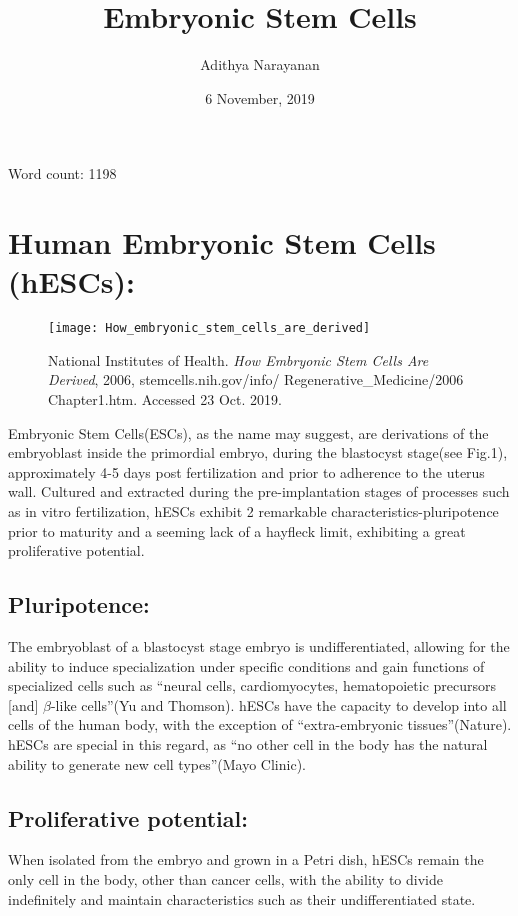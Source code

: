 \documentclass[11pt, a4]{article}
\title{\vspace{90mm}Embryonic Stem Cells}
\author{Adithya Narayanan}
\date{6 November, 2019}
\begin{document}
	\begin{titlepage}
		\maketitle
		\centering
			Word count: 1198
		\thispagestyle{empty}
	\end{titlepage}
	\newpage
	\tableofcontents
	\thispagestyle{empty}
	\newpage
	\setcounter{page}{1}
	\section{Human Embryonic Stem Cells (hESCs):}
	
		\begin{wrapfigure}{r}{4 cm}
			\centering
			\texttt{[image: How\_embryonic\_stem\_cells\_are\_derived]}
			\caption{\footnotesize National Institutes of Health. \textit{How Embryonic Stem Cells Are Derived}, 2006, stemcells.nih.gov/info/
				Regenerative\_Medicine/2006
				Chapter1.htm. Accessed 23 Oct. 2019.}
			\vspace{-55pt}
		\end{wrapfigure}
	
		Embryonic Stem Cells(ESCs), as the name may suggest, are derivations of the embryoblast inside the primordial embryo, during the blastocyst stage(see Fig.1), approximately 4-5 days post fertilization and prior to adherence to the uterus wall. Cultured and extracted during the pre-implantation stages of processes such as in vitro fertilization, hESCs exhibit 2 remarkable characteristics-pluripotence prior to maturity and a seeming lack of a hayfleck limit, exhibiting a great proliferative potential.
		
		\subsection{Pluripotence:}
			The embryoblast of a blastocyst stage embryo is undifferentiated, allowing for the ability to induce specialization under specific conditions and gain functions of specialized cells such as ``neural cells, cardiomyocytes, hematopoietic precursors [and] $\beta$-like cells''(Yu and Thomson). hESCs have the capacity to develop into all cells of the human body, with the exception of ``extra-embryonic tissues''(Nature). hESCs are special in this regard, as ``no other cell in the body has the natural ability to generate new cell types''(Mayo Clinic).
			
		\subsection{Proliferative potential:}
			When isolated from the embryo and grown in a Petri dish, hESCs remain the only cell in the body, other than cancer cells, with the ability to divide indefinitely and maintain characteristics such as their undifferentiated state. 
		
\end{document}
